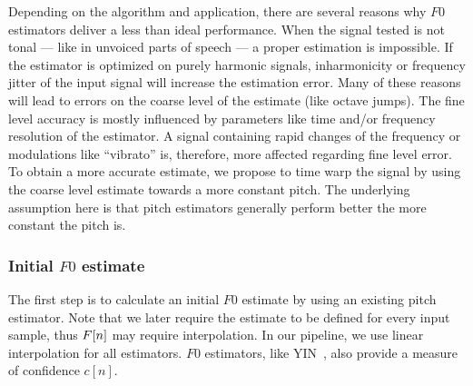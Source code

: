 Depending on the algorithm and application, there are several reasons why $F0$ estimators deliver a less than ideal performance. When the signal tested is not tonal --- like in unvoiced parts of speech --- a proper estimation is impossible. If the estimator is optimized on purely harmonic signals, inharmonicity or frequency jitter of the input signal will increase the estimation error. Many of these reasons will lead to errors on the coarse level of the estimate (like octave jumps). The fine level accuracy is mostly influenced by parameters like time and/or frequency resolution of the estimator. A signal containing rapid changes of the frequency or modulations like ``vibrato'' is, therefore, more affected regarding fine level error. To obtain a more accurate estimate, we propose to time warp the signal by using the coarse level estimate towards a more constant pitch. The underlying assumption here is that pitch estimators generally perform better the more constant the pitch is.

\subsubsection{Initial $F0$ estimate}
\label{ssub:initial_estimate}

The first step is to calculate an initial $F0$ estimate by using an existing pitch estimator. Note that we later require the estimate to be defined for every input sample, thus ${F}[n]$ may require interpolation. In our pipeline, we use linear interpolation for all estimators. $F0$ estimators, like YIN~\cite{decheveigne02}, also provide a measure of confidence $c[n]$.
\par
%
%

